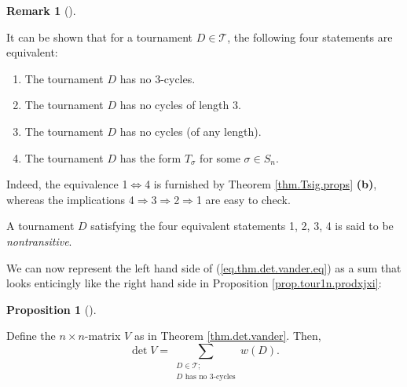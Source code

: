 \documentclass[numbers=enddot,12pt,final,onecolumn,notitlepage]{scrartcl}%
\numberwithin{exer}{subsection}
\theoremstyle{definition}
\newtheorem{prop}[theo]{Proposition}
\newenvironment{proposition}[1][]
{\begin{prop}[#1]\begin{leftbar}}
{\end{leftbar}\end{prop}}
\newtheorem{remk}[theo]{Remark}
\newenvironment{remark}[1][]
{\begin{remk}[#1]\begin{leftbar}}
{\end{leftbar}\end{remk}}
\let\sumnonlimits\sum
\renewcommand{\sum}{\sumnonlimits\limits}
\begin{document}
\begin{remark}
It can be shown that for a tournament $D\in\mathcal{T}$, the following four
statements are equivalent:

\begin{enumerate}
\item The tournament $D$ has no $3$-cycles.

\item The tournament $D$ has no cycles of length $3$.

\item The tournament $D$ has no cycles (of any length).

\item The tournament $D$ has the form $T_{\sigma}$ for some $\sigma\in S_{n}$.
\end{enumerate}

Indeed, the equivalence 1$\Longleftrightarrow$4 is furnished by Theorem
\ref{thm.Tsig.props} \textbf{(b)}, whereas the implications 4$\Longrightarrow
$3$\Longrightarrow$2$\Longrightarrow$1 are easy to check.

A tournament $D$ satisfying the four equivalent statements 1, 2, 3, 4 is said
to be \emph{nontransitive}.
\end{remark}

We can now represent the left hand side of (\ref{eq.thm.det.vander.eq}) as a
sum that looks enticingly like the right hand side in Proposition
\ref{prop.tour1n.prodxjxi}:

\begin{proposition}
\label{prop.Tsig.Vassum}Define the $n\times n$-matrix $V$ as in Theorem
\ref{thm.det.vander}. Then,%
\[
\det V=\sum_{\substack{D\in\mathcal{T};\\D\text{ has no }3\text{-cycles}%
}}w\left(  D\right)  .
\]

\end{proposition}
\end{document}
